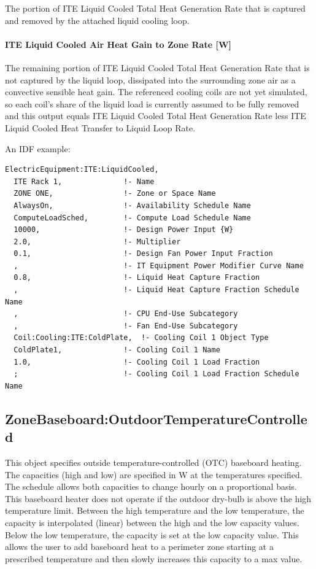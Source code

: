 The portion of ITE Liquid Cooled Total Heat Generation Rate that is captured and removed by the attached liquid cooling loop.

\paragraph{ITE Liquid Cooled Air Heat Gain to Zone Rate {[}W{]}}\label{ite-liquid-cooled-air-heat-gain-to-zone-rate}

The remaining portion of ITE Liquid Cooled Total Heat Generation Rate that is not captured by the liquid loop, dissipated into the surrounding zone air as a convective sensible heat gain. The referenced cooling coils are not yet simulated, so each coil's share of the liquid load is currently assumed to be fully removed and this output equals ITE Liquid Cooled Total Heat Generation Rate less ITE Liquid Cooled Heat Transfer to Liquid Loop Rate.

An IDF example:

\begin{lstlisting}
ElectricEquipment:ITE:LiquidCooled,
  ITE Rack 1,              !- Name
  ZONE ONE,                !- Zone or Space Name
  AlwaysOn,                !- Availability Schedule Name
  ComputeLoadSched,        !- Compute Load Schedule Name
  10000,                   !- Design Power Input {W}
  2.0,                     !- Multiplier
  0.1,                     !- Design Fan Power Input Fraction
  ,                        !- IT Equipment Power Modifier Curve Name
  0.8,                     !- Liquid Heat Capture Fraction
  ,                        !- Liquid Heat Capture Fraction Schedule Name
  ,                        !- CPU End-Use Subcategory
  ,                        !- Fan End-Use Subcategory
  Coil:Cooling:ITE:ColdPlate,  !- Cooling Coil 1 Object Type
  ColdPlate1,              !- Cooling Coil 1 Name
  1.0,                     !- Cooling Coil 1 Load Fraction
  ;                        !- Cooling Coil 1 Load Fraction Schedule Name
\end{lstlisting}

\subsection{ZoneBaseboard:OutdoorTemperatureControlled}\label{zonebaseboardoutdoortemperaturecontrolled}

This object specifies outside temperature-controlled (OTC) baseboard heating. The capacities (high and low) are specified in W at the temperatures specified. The schedule allows both capacities to change hourly on a proportional basis. This baseboard heater does not operate if the outdoor dry-bulb is above the high temperature limit. Between the high temperature and the low temperature, the capacity is interpolated (linear) between the high and the low capacity values. Below the low temperature, the capacity is set at the low capacity value. This allows the user to add baseboard heat to a perimeter zone starting at a prescribed temperature and then slowly increases this capacity to a max value.


